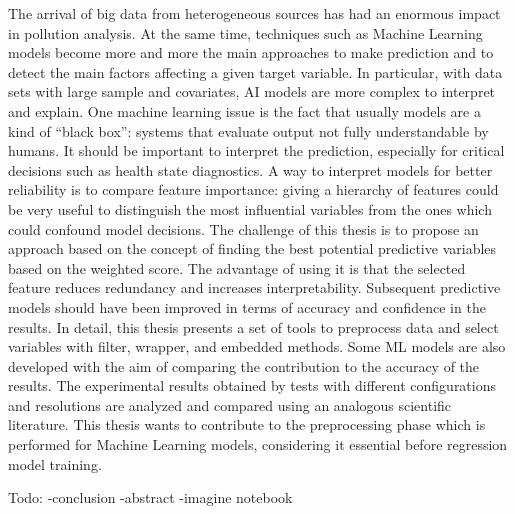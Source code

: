 The arrival of big data from heterogeneous sources has had an enormous impact in pollution analysis.
At the same time, techniques such as Machine Learning models become more and more the main approaches to make prediction and to detect the main factors affecting a given target variable.
In particular, with data sets with large sample and covariates, AI models are more complex to interpret and explain.
One machine learning issue is the fact that usually models are a kind of “black box”: systems that evaluate output not fully understandable by humans. 
It should be important to interpret the prediction, especially for critical decisions such as health state diagnostics.
A way to interpret models for better reliability is to compare feature importance: giving a hierarchy of features could be very useful to distinguish the most influential variables from the ones which could confound model decisions.
The challenge of this thesis is to propose an approach based on the concept of finding the best potential predictive variables based on the weighted score.
The advantage of using it is that the selected feature reduces redundancy and increases interpretability. 
Subsequent predictive models should have been improved in terms of accuracy and confidence in the results.
In detail, this thesis presents a set of tools to preprocess data and select variables with filter, wrapper, and embedded methods.
Some ML models are also developed with the aim of comparing the contribution to the accuracy of the results.
The experimental results obtained by tests with different configurations and resolutions are analyzed and compared using an analogous scientific literature.
This thesis wants to contribute to the preprocessing phase which is performed for Machine Learning models, considering it essential before regression model training.

Todo:
-conclusion 
-abstract
-imagine notebook